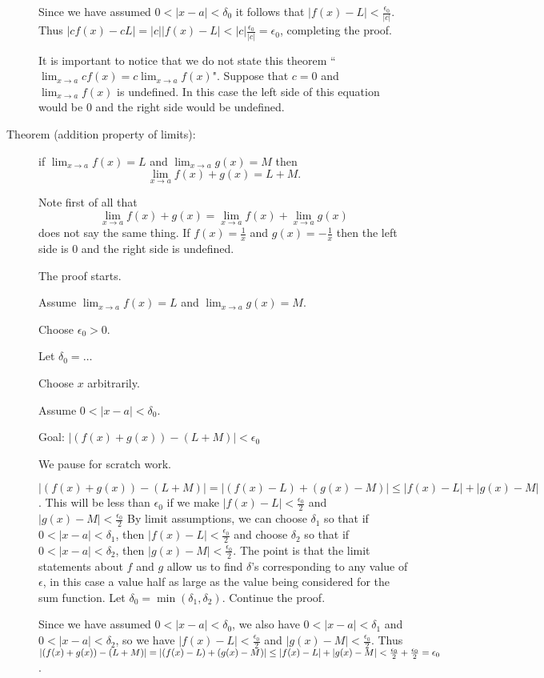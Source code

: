 \documentclass[12pt]{article}
\begin{document}
\begin{description}
Since we have assumed $0<|x-a|<\delta_0$ it follows that $|f(x)-L|<\frac{\epsilon_0}{|c|}$.  Thus
$|cf(x)-cL| = |c||f(x)-L| < |c|\frac{\epsilon_0}{|c|}=\epsilon_0$, completing the proof.

It is important to notice that we do not state this theorem ``$\lim_{x\rightarrow a}cf(x)=c\lim_{x\rightarrow a} f(x)$".
Suppose that $c=0$ and $\lim_{x\rightarrow a}f(x)$ is undefined.  In this case the left side of this equation would be 0
and the right side would be undefined.

\item[Theorem (addition property of limits):]  if $\lim_{x \rightarrow a} f(x)=L$ and $\lim_{x \rightarrow a}g(x)=M$ then
$$\lim_{x \rightarrow a} f(x)+g(x) = L+M.$$

Note first of all that $$\lim_{x \rightarrow a} f(x)+g(x) = \lim_{x \rightarrow a}f(x)+\lim_{x \rightarrow a}g(x)$$ does not say the same thing.  If $f(x)=\frac 1x$ and $g(x)=-\frac 1x$ then the left side is 0 and the right side is undefined.

The proof starts.  

Assume $\lim_{x \rightarrow a} f(x)=L$ and $\lim_{x \rightarrow a}g(x)=M$.

Choose $\epsilon_0>0$.

Let $\delta_0=\ldots$

Choose $x$ arbitrarily.

Assume $0<|x-a|<\delta_0$.

Goal:  $|(f(x)+g(x))-(L+M)|<\epsilon_0$

We pause for scratch work.

$|(f(x)+g(x))-(L+M)| = |(f(x)-L) + (g(x)-M)| \leq |f(x)-L| + |g(x)-M|$.  This will be less than $\epsilon_0$
if we make  $|f(x)-L|<\frac{\epsilon_0}2$ and $|g(x)-M|<\frac{\epsilon_0}2$  By limit assumptions, we can
choose $\delta_1$ so that if $0<|x-a|<\delta_1$, then $|f(x)-L|<\frac{\epsilon_0}2$  and choose $\delta_2$ so that if $0<|x-a|<\delta_2$, then $|g(x)-M|<\frac{\epsilon_0}2$.  The point is that the limit statements about $f$ and $g$
allow us to find $\delta$'s corresponding to any value of $\epsilon$, in this case a value half as large as the value being considered for the sum function.  Let $\delta_0 = \min(\delta_1,\delta_2)$.  Continue the proof.

Since we have assumed $0<|x-a|<\delta_0$, we also have $0<|x-a|<\delta_1$ and $0<|x-a|<\delta_2$, so
we have $|f(x)-L|<\frac{\epsilon_0}2$ and $|g(x)-M|<\frac{\epsilon_0}2$.  Thus $|(f(x)+g(x))-(L+M)| = |(f(x)-L)+(g(x)-M)| \newline \leq |f(x)-L| + |g(x)-M| < \frac{\epsilon_0}2 +\frac{\epsilon_0}2 = \epsilon_0$.


\end{description}
\end{document}
